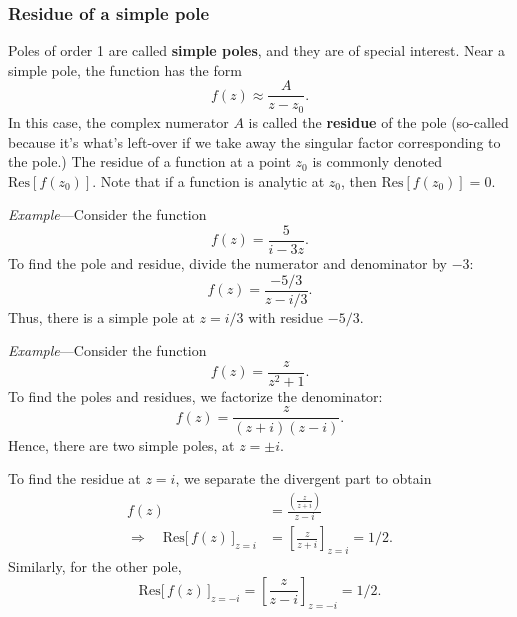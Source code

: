 \documentclass[10pt,a4paper]{article}
\begin{document}
\subsubsection{Residue of a simple pole}
\label{residue-of-a-simple-pole}

Poles of order 1 are called \textbf{simple poles}, and they are of
special interest. Near a simple pole, the function has the form
\begin{equation}
f(z) \approx \frac{A}{z-z_0}.
\end{equation}
In this case, the complex numerator $A$ is called the \textbf{residue}
of the pole (so-called because it's what's left-over if we take away the
singular factor corresponding to the pole.) The residue of a function at
a point $z_0$ is commonly denoted $\mathrm{Res}[f(z_0)]$. Note that
if a function is analytic at $z_0$, then $\mathrm{Res}[f(z_0)] = 0$.

\begin{framed}\noindent
  \textit{Example}---Consider the function
  \begin{equation}
    f(z) = \frac{5}{i-3z}.
  \end{equation}
  To find the pole and residue, divide the numerator and denominator
  by $-3$:
  \begin{equation}
    f(z) = \frac{-5/3}{z-i/3}.
  \end{equation}
  Thus, there is a simple pole at $z = i/3$ with residue $-5/3$.
\end{framed}

\begin{framed}\noindent
  \textit{Example}---Consider the function
  \begin{equation}
    f(z) = \frac{z}{z^2 + 1}.
  \end{equation}
  To find the poles and residues, we factorize the denominator:
  \begin{equation}
    f(z) = \frac{z}{(z+i)(z-i)}.
  \end{equation}
  Hence, there are two simple poles, at $z = \pm i$.

  To find the residue at $z = i$, we separate the divergent part to obtain
  \begin{align}
    f(z) &= \frac{\left(\frac{z}{z+i}\right)}{z-i} \\
    \Rightarrow\quad \mathrm{Res}\big[\,f(z)\,\big]_{z=i} &= \left[\frac{z}{z+i}\right]_{z=i} = 1/2.
  \end{align}
  Similarly, for the other pole,
  \begin{equation}
    \mathrm{Res}\big[\,f(z)\,\big]_{z=-i} = \left[\frac{z}{z-i}\right]_{z=-i} = 1/2.
  \end{equation}
\end{framed}
\end{document}
